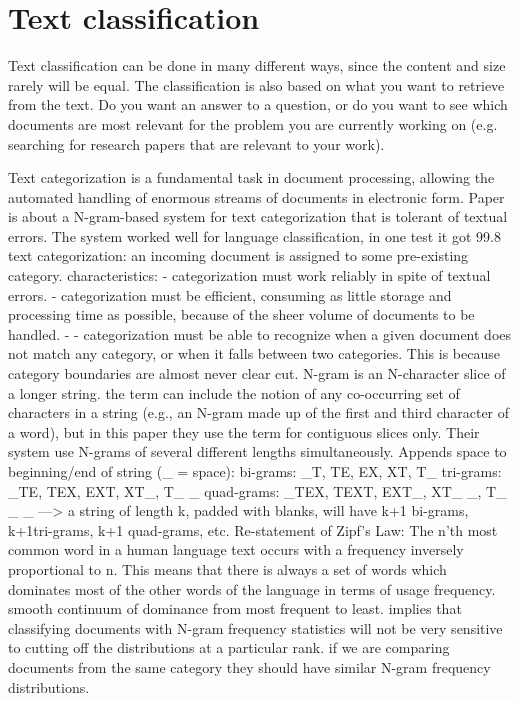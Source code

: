\section{Text classification}
\label{sec:text_classification}
Text classification can be done in many different ways, since the content and size rarely will be equal. 
The classification is also based on what you want to retrieve from the text. 
Do you want an answer to a question, or do you want to see which documents are most relevant for the problem you are currently working on 
(e.g. searching for research papers that are relevant to your work).

Text categorization is a fundamental task in document processing, allowing the automated handling of enormous streams of documents in electronic form. Paper is about a N-gram-based system for text categorization that is tolerant of textual errors. The system worked well for language classification, in one test it got 99.8%
text categorization: an incoming document is assigned to some pre-existing category. characteristics:
-	categorization must work reliably in spite of textual errors.
-	categorization must be efficient, consuming as little storage and processing time as possible, because of the sheer volume of documents to be handled.
-	- categorization must be able to recognize when a given document does not match any category, or when it falls between two categories. This is because   category boundaries are almost never clear cut.
N-gram is an N-character slice of a longer string. the term can include the notion of any co-occurring set of characters in a string (e.g., an N-gram made up of the first and third character of a word), but in this paper they use the term for contiguous slices only. Their system use N-grams of several different lengths simultaneously. Appends space to beginning/end of string (\_ = space): 
bi-grams: \_T, TE, EX, XT, T\_
tri-grams: \_TE, TEX, EXT, XT\_, T\_ \_
quad-grams: \_TEX, TEXT, EXT\_, XT\_ \_, T\_ \_ \_
---> a string of length k, padded with blanks, will have k+1 bi-grams, k+1tri-grams, k+1 quad-grams, etc.
Re-statement of Zipf's Law: The n'th most common word in a human language text occurs with a frequency inversely proportional to n. This means that there is always a set of words which dominates most of the other words of the language in terms of usage frequency. smooth continuum of dominance from most frequent to least. implies that classifying documents with N-gram frequency statistics will  not be very sensitive to cutting off the distributions at a particular rank. if we are comparing documents from the same category they  should have similar N-gram frequency distributions.
